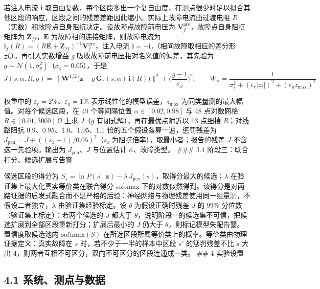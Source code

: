 \documentclass[
  11pt,
]{ctexart}
\begin{document}
若注入电流 \(\mathbf i\)
取自由复数，每个区段多出一个复自由度，在测点很少时足以拟合其他区段的响应，区段之间的残差差距因此缩小。实际上故障电流由过渡电阻
\(R\)（实数）和故障点自身阻抗决定。设故障点故障前电压为
\(\mathbf V_{f}^{\mathrm{pre}}\)，故障点自身阻抗矩阵为
\(\mathbf Z_{ff}\)，\(\mathbf E\) 为故障相的连接矩阵，则故障电流为
\(\mathbf i_f(R)=(R\mathbf E+\mathbf Z_{ff})^{-1}\mathbf V_f^{\mathrm{pre}}\)，注入电流
\(\mathbf i=-\mathbf i_f\)（相间故障取相应的差分形式）。再引入实数增益
\(g\) 吸收故障前电压相对名义值的偏差，其先验为
\(g\sim\mathcal N(1,\sigma_g^2)\)（\(\sigma_g=0.05\)），于是
\[J(s,\alpha,R,g)=\big\|\mathbf W^{1/2}\big(\mathbf z-g\,\mathbf G_{\tau}(s,\alpha)\,\mathbf i(R)\big)\big\|^{2}+\Big(\frac{g-1}{\sigma_g}\Big)^{2},\qquad W_{ii}=\frac{1}{\sigma_i^{2}+(\varepsilon_r|z_i|)^{2}+(\varepsilon_a z_{\max})^{2}}\]

权重中的 \(\varepsilon_r=2\%\)、\(\varepsilon_a=1\%\)
表示线性化的模型误差，\(z_{\max}\)
为同类量测的最大幅值。对每个候选区段，在 49 个等间隔位置
\(\alpha\in[0.02,0.98]\) 与 48 点对数网格 \(R\in[0.01,3000]\,\Omega\)
上求 \(J\)（\(g\) 有闭式解），再在最优点附近以 13 点细搜
\(R\)；对线路阻抗 0.9、0.95、1.0、1.05、1.1
倍的五个假设各算一遍，惩罚残差为
\(J_{\mathrm{pen}}=J+((s_z-1)/0.05)^2\)（\(s_z\)
为阻抗倍率），取最小者；报告的残差 \(J\) 不含这一先验项。输出为
\(J_{\mathrm{pen}}\)、\(J\) 与位置估计 \(\hat\alpha\)、故障类型。 \#\#\#
3.4 阶段三：联合打分、候选扩展与告警

候选区段的得分为
\(S_s=\ln P(s\mid\mathbf z)-\lambda\,J_{\mathrm{pen}}(s)\)，取得分最大的候选；\(\lambda\)
在验证集上最大化真实等价类在联合得分 softmax
下的对数似然得到。该得分是对两路证据的启发式融合而不是严格的后验：神经网络与物理残差使用同一组量测，不假设二者独立，\(\lambda\)
由验证集经验标定。设 \(\theta\) 为假设正确时残差 \(J\) 的 99\%
分位数（验证集上标定）：若两个候选的 \(J\) 都大于
\(\theta\)，说明阶段一的候选集不可信，把候选扩展到全部区段重新打分；扩展后最小的
\(J\) 仍大于 \(\theta\)，则标记模型失配告警。置信度取候选池内
\(\mathrm{softmax}(S)\)
在所选区段所属等价类上的概率。等价类由物理证据定义：真实故障在 \(s\)
时，若不少于一半的样本中区段 \(s'\) 的惩罚残差不比 \(s\) 大出
4，则两者互相不可区分，双向不可区分的区段连通成一类。 \#\# 4 实验设置

\hypertarget{ux7cfbux7edfux6d4bux70b9ux4e0eux6570ux636e}{%
\subsection{4.1
系统、测点与数据}\label{ux7cfbux7edfux6d4bux70b9ux4e0eux6570ux636e}}
\end{document}
